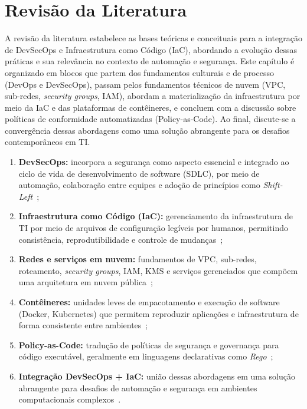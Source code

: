 \chapter{Revisão da Literatura}

A revisão da literatura estabelece as bases teóricas e conceituais para a integração de DevSecOps e Infraestrutura como Código (IaC), abordando a evolução dessas práticas e sua relevância no contexto de automação e segurança. Este capítulo é organizado em blocos que partem dos fundamentos culturais e de processo (DevOps e DevSecOps), passam pelos fundamentos técnicos de nuvem (VPC, sub-redes, \textit{security groups}, IAM), abordam a materialização da infraestrutura por meio da IaC e das plataformas de contêineres, e concluem com a discussão sobre políticas de conformidade automatizadas (Policy-as-Code). Ao final, discute-se a convergência dessas abordagens como uma solução abrangente para os desafios contemporâneos em TI.

\begin{enumerate}
    \item \textbf{DevSecOps:} incorpora a segurança como aspecto essencial e integrado ao ciclo de vida de desenvolvimento de software (SDLC), por meio de automação, colaboração entre equipes e adoção de princípios como \textit{Shift-Left}~;
    \item \textbf{Infraestrutura como Código (IaC):} gerenciamento da infraestrutura de TI por meio de arquivos de configuração legíveis por humanos, permitindo consistência, reprodutibilidade e controle de mudanças~;
    \item \textbf{Redes e serviços em nuvem:} fundamentos de VPC, sub-redes, roteamento, \textit{security groups}, IAM, KMS e serviços gerenciados que compõem uma arquitetura em nuvem pública~;
    \item \textbf{Contêineres:} unidades leves de empacotamento e execução de software (Docker, Kubernetes) que permitem reproduzir aplicações e infraestrutura de forma consistente entre ambientes~;
    \item \textbf{Policy-as-Code:} tradução de políticas de segurança e governança para código executável, geralmente em linguagens declarativas como \textit{Rego}~;
    \item \textbf{Integração DevSecOps + IaC:} união dessas abordagens em uma solução abrangente para desafios de automação e segurança em ambientes computacionais complexos~.
\end{enumerate}

